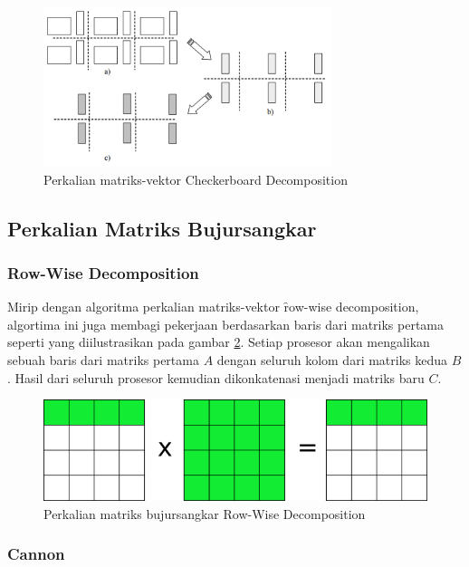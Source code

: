 \begin{figure}
	\centering
	\includegraphics[width=0.75\textwidth]
	{pics/mv_checkerboard}
	\caption{Perkalian matriks-vektor Checkerboard Decomposition}
	\label{fig:mv_checkerboard}
\end{figure}  

\subsection{Perkalian Matriks Bujursangkar} 

\subsubsection{Row-Wise Decomposition}

Mirip dengan algoritma perkalian matriks-vektor \f{row-wise decomposition}, algortima ini juga membagi pekerjaan berdasarkan baris dari matriks pertama seperti yang diilustrasikan pada gambar \ref{fig:mm_rowwise}. Setiap prosesor akan mengalikan sebuah baris dari matriks pertama $A$ dengan seluruh kolom dari matriks kedua $B$. Hasil dari seluruh prosesor kemudian dikonkatenasi menjadi matriks baru $C$.

\begin{figure}
	\centering
	\includegraphics[width=1\textwidth]
	{pics/mm_rowwise}
	\caption{Perkalian matriks bujursangkar Row-Wise Decomposition}
	\label{fig:mm_rowwise}
\end{figure}

\subsubsection{Cannon}

